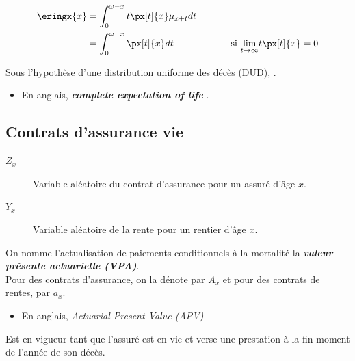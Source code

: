 \documentclass[10pt, french]{article}
\begin{document}
\begin{multicols*}{2}
\setlength{\mathindent}{-1cm}
\begin{definitionNOHFILLsub}
\begin{align*}
	\eringx{x}
	&=	\int_{0}^{\omega - x} t \px[t]{x} \mu_{x + t} dt	\\
	&=	\int_{0}^{\omega - x} \px[t]{x} dt	\qquad\qquad\quad\quad	\text{si } \limz{t}{\infty} t \px[t]{x} = 0
\end{align*}

Sous l'hypothèse d'une distribution uniforme des décès (DUD), .

\begin{itemize}
	\item	En anglais, \og \textit{\textbf{complete expectation of life}} \fg{}.
\end{itemize}
\end{definitionNOHFILLsub}


\columnbreak
\subsection{Contrats d'assurance vie}
\begin{distributions}[Notation]
\begin{description}
	\item[$Z_{x}$]	Variable aléatoire du contrat d'assurance pour un assuré d'âge $x$.
	\item[$Y_{x}$]	Variable aléatoire de la rente pour un rentier d'âge $x$.
\end{description}
\end{distributions}


\begin{definitionNOHFILL}
On nomme l'actualisation de paiements conditionnels à la mortalité la \textit{\textbf{valeur présente actuarielle (VPA)}}. \\

Pour des contrats d'assurance, on la dénote par $A_{x}$ et pour des contrats de rentes, par $a_{x}$.

\begin{itemize}
	\item	En anglais, \og \textit{Actuarial Present Value (APV)} \fg{}
\end{itemize}
\end{definitionNOHFILL}


\begin{definitionNOHFILLsub}
Est en vigueur tant que l'assuré est en vie et verse une prestation à la fin moment de l'année de son décès.


\end{definitionNOHFILLsub}
\end{multicols*}
\end{document}
